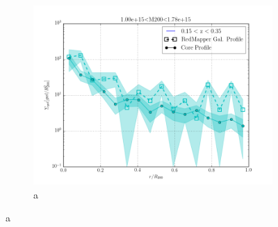 \documentclass[twocolumn]{article}
\begin{document}
\begin{figure}
\begin{subfigure}{.5\textwidth}
    \centering\includegraphics[width=1.0\linewidth]{figs/cfn/basic_rd_rm.param/plot_zmrs.py/fig6.png}
    \caption{a}
  \end{subfigure}
  
\end{figure}
\clearpage
\end{document}
